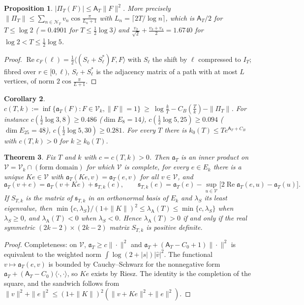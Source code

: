 \documentclass[11pt]{amsart}
\newtheorem{theorem}{Theorem}[section]
\newtheorem{proposition}[theorem]{Proposition}
\newtheorem{corollary}[theorem]{Corollary}
\theoremstyle{definition}
\theoremstyle{remark}
\newcommand{\Rel}{\operatorname{Re}}
\newcommand{\IT}{I_T}
\newcommand{\cF}{c_F}
\newcommand{\NT}{\mathcal N_T}
\newcommand{\Aconst}{\mathsf A_T}
\newcommand{\PiT}{\Pi_T}
\newcommand{\lamA}{\lambda_{\mathrm A}}
\begin{document}
\begin{proposition}\label{prop:prime}
$|\PiT(F)|\le\Aconst\|F\|^2$. More precisely $\|\PiT\|\le\sum_{n\in\NT}v_n\cos\frac\pi{L_n+1}$ with $L_n=\lceil2T/\log n\rceil$,
which is $\Aconst/2$ for $T\le\log2$ ($=0.4901$ for $T\le\frac12\log3$) and $\frac{v_2}{\sqrt2}+\frac{v_3+v_4}2=1.6740$ for
$\log2<T\le\frac12\log5$.
\end{proposition}
\begin{proof}
$\Rel\cF(\ell)=\frac12\langle(S_\ell+S_\ell^*)F,F\rangle$ with $S_\ell$ the shift by $\ell$ compressed to $\IT$; fibred over
$r\in[0,\ell)$, $S_\ell+S_\ell^*$ is the adjacency matrix of a path with at most $L$ vertices, of norm $2\cos\frac\pi{L+1}$.
\end{proof}

\begin{corollary}\label{cor:L1}
$c(T,k):=\inf\{\mathfrak a_T(F):F\in\mathcal V_k,\|F\|=1\}\ \ge\ \log\frac kT-C_B(\frac Tk)-\|\PiT\|$. For instance
$c(\frac12\log3,8)\ge0.486$ ($\dim E_8=14$), $c(\frac12\log5,25)\ge0.094$ ($\dim E_{25}=48$), $c(\frac12\log5,30)\ge0.281$.
For every $T$ there is $k_0(T)\le Te^{\Aconst+C_B}$ with $c(T,k)>0$ for $k\ge k_0(T)$.
\end{corollary}

\begin{theorem}\label{thm:schur}
Fix $T$ and $k$ with $c=c(T,k)>0$. Then $\mathfrak a_T$ is an inner product on $\mathcal V=\mathcal V_k\cap(\text{form domain})$
for which $\mathcal V$ is complete, for every $e\in E_k$ there is a unique $Ke\in\mathcal V$ with
$\mathfrak a_T(Ke,v)=\mathfrak a_T(e,v)$ for all $v\in\mathcal V$, and
\[
\mathfrak a_T(v+e)=\mathfrak a_T(v+Ke)+\mathfrak s_{T,k}(e),\qquad
\mathfrak s_{T,k}(e)=\mathfrak a_T(e)-\sup_{u\in\mathcal V}\big[2\Rel\mathfrak a_T(e,u)-\mathfrak a_T(u)\big].
\]
If $S_{T,k}$ is the matrix of $\mathfrak s_{T,k}$ in an orthonormal basis of $E_k$ and $\lambda_S$ its least eigenvalue, then
$\min\{c,\lambda_S\}/(1+\|K\|)^2\le\lamA(T)\le\min\{c,\lambda_S\}$ when $\lambda_S\ge0$, and $\lamA(T)<0$ when $\lambda_S<0$. Hence $\lamA(T)>0$ if and only if the real symmetric
$(2k-2)\times(2k-2)$ matrix $S_{T,k}$ is positive definite.
\end{theorem}
\begin{proof}
Completeness: on $\mathcal V$, $\mathfrak a_T\ge c\|\cdot\|^2$ and $\mathfrak a_T+(\Aconst-C_0+1)\|\cdot\|^2$ is equivalent to the
weighted norm $\int\log(2+|s|)|\widehat v|^2$. The functional $v\mapsto\mathfrak a_T(e,v)$ is bounded by Cauchy--Schwarz for the
nonnegative form $\mathfrak a_T+(\Aconst-C_0)\langle\cdot,\cdot\rangle$, so $Ke$ exists by Riesz. The identity is the completion of
the square, and the sandwich follows from $\|v\|^2+\|e\|^2\le(1+\|K\|)^2(\|v+Ke\|^2+\|e\|^2)$.
\end{proof}
\end{document}
